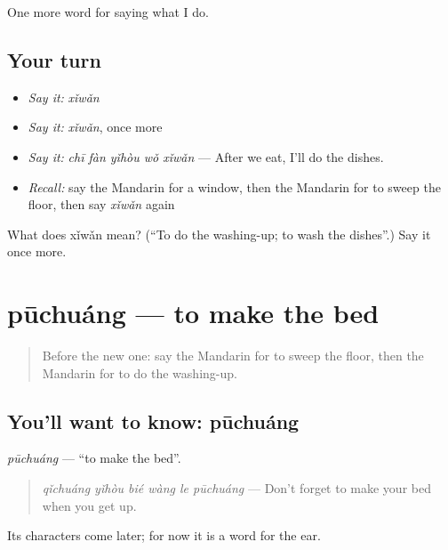 \begin{grammarlens}[title={What you've built}]
One more word for saying what I do.
\end{grammarlens}

\subsection*{Your turn}
\begin{itemize}
\raggedright
  \item \emph{Say it:} \emph{xǐwǎn}
  \item \emph{Say it:} \emph{xǐwǎn}, once more
  \item \emph{Say it:} \emph{chī fàn yǐhòu wǒ xǐwǎn} — After we eat, I'll do the dishes.
  \item \emph{Recall:} say the Mandarin for a window, then the Mandarin for to sweep the floor, then say \emph{xǐwǎn} again
\end{itemize}

\begin{tcolorbox}[breakable,colback=teal!4,colframe=teal!35!black,title={Before you move on}]
What does xǐwǎn mean? (\textquotedblleft{}To do the washing-up; to wash the dishes\textquotedblright{}.) Say it once more.
\end{tcolorbox}
\section[pūchuáng]{pūchuáng — to make the bed}

\label{lesson:ZH-C160-puchuang}



\begin{quote}
Before the new one: say the Mandarin for to sweep the floor, then the Mandarin for to do the washing-up.
\end{quote}

\subsection*{You'll want to know: pūchuáng}
\emph{pūchuáng} — \textquotedblleft{}to make the bed\textquotedblright{}.

\begin{quote}
\emph{qǐchuáng yǐhòu bié wàng le pūchuáng} — Don't forget to make your bed when you get up.
\end{quote}

Its characters come later; for now it is a word for the ear.

